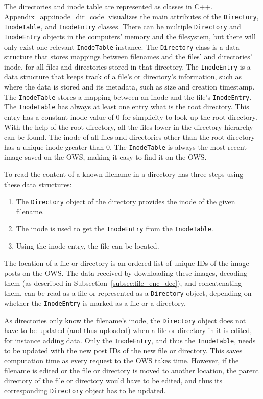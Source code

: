 The directories and inode table are represented as classes in C++. Appendix~\ref{app:inode_dir_code} visualizes the main attributes of the \texttt{Directory}, \texttt{InodeTable}, and \texttt{InodeEntry} classes. There can be multiple \texttt{Directory} and \texttt{InodeEntry} objects in the computers' memory and the filesystem, but there will only exist one relevant \texttt{InodeTable} instance. The \texttt{Directory} class is a data structure that stores mappings between filenames and the files' and directories' inode, for all files and directories stored in that directory. The \texttt{InodeEntry} is a data structure that keeps track of a file's or directory's information, such as where the data is stored and its metadata, such as size and creation timestamp. The \texttt{InodeTable} stores a mapping between an inode and the file's \texttt{InodeEntry}. The \texttt{InodeTable} has always at least one entry what is the root directory. This entry has a constant inode value of 0 for simplicity to look up the root directory. With the help of the root directory, all the files lower in the directory hierarchy can be found. The inode of all files and directories other than the root directory has a unique inode greater than 0. The \texttt{InodeTable} is always the most recent image saved on the \gls{OWS}, making it easy to find it on the \gls{OWS}.

To read the content of a known filename in a directory has three steps using these data structures:
\begin{enumerate}
	\item The \texttt{Directory} object of the directory provides the inode of the given filename.
	\item The inode is used to get the \texttt{InodeEntry} from the \texttt{InodeTable}.
	\item Using the inode entry, the file can be located.
\end{enumerate}
The location of a file or directory is an ordered list of unique IDs of the image posts on the \gls{OWS}. The data received by downloading these images, decoding them (as described in Subsection~\ref{subsec:file_enc_dec}), and concatenating them, can be read as a file or represented as a \texttt{Directory} object, depending on whether the \texttt{InodeEntry} is marked as a file or a directory. 

As directories only know the filename's inode, the \texttt{Directory} object does not have to be updated (and thus uploaded) when a file or directory in it is edited, for instance adding data. Only the \texttt{InodeEntry}, and thus the \texttt{InodeTable}, needs to be updated with the new post IDs of the new file or directory. This saves computation time as every request to the \gls{OWS} takes time. However, if the filename is edited or the file or directory is moved to another location, the parent directory of the file or directory would have to be edited, and thus its corresponding \texttt{Directory} object has to be updated.

